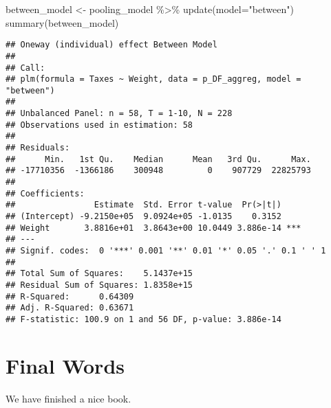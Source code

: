 \documentclass[
]{book}
\newenvironment{Shaded}{\begin{snugshade}}{\end{snugshade}}
\newcommand{\AttributeTok}[1]{\textcolor[rgb]{0.77,0.63,0.00}{#1}}
\newcommand{\FunctionTok}[1]{\textcolor[rgb]{0.00,0.00,0.00}{#1}}
\newcommand{\NormalTok}[1]{#1}
\newcommand{\OtherTok}[1]{\textcolor[rgb]{0.56,0.35,0.01}{#1}}
\newcommand{\SpecialCharTok}[1]{\textcolor[rgb]{0.00,0.00,0.00}{#1}}
\newcommand{\StringTok}[1]{\textcolor[rgb]{0.31,0.60,0.02}{#1}}
\begin{document}
\begin{Shaded}
\begin{Highlighting}[]
\NormalTok{between\_model }\OtherTok{\textless{}{-}}\NormalTok{ pooling\_model }\SpecialCharTok{\%\textgreater{}\%} \FunctionTok{update}\NormalTok{(}\AttributeTok{model=}\StringTok{"between"}\NormalTok{)}
\FunctionTok{summary}\NormalTok{(between\_model)}
\end{Highlighting}
\end{Shaded}

\begin{verbatim}
## Oneway (individual) effect Between Model
## 
## Call:
## plm(formula = Taxes ~ Weight, data = p_DF_aggreg, model = "between")
## 
## Unbalanced Panel: n = 58, T = 1-10, N = 228
## Observations used in estimation: 58
## 
## Residuals:
##      Min.   1st Qu.    Median      Mean   3rd Qu.      Max. 
## -17710356  -1366186    300948         0    907729  22825793 
## 
## Coefficients:
##                Estimate  Std. Error t-value  Pr(>|t|)    
## (Intercept) -9.2150e+05  9.0924e+05 -1.0135    0.3152    
## Weight       3.8816e+01  3.8643e+00 10.0449 3.886e-14 ***
## ---
## Signif. codes:  0 '***' 0.001 '**' 0.01 '*' 0.05 '.' 0.1 ' ' 1
## 
## Total Sum of Squares:    5.1437e+15
## Residual Sum of Squares: 1.8358e+15
## R-Squared:      0.64309
## Adj. R-Squared: 0.63671
## F-statistic: 100.9 on 1 and 56 DF, p-value: 3.886e-14
\end{verbatim}

\hypertarget{final-words}{%
\chapter{Final Words}\label{final-words}}

We have finished a nice book.

  
\end{document}
